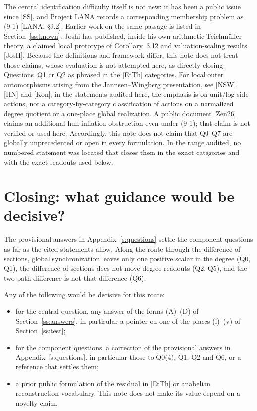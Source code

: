 \documentclass[11pt]{article}
\theoremstyle{definition}
\begin{document}
The central identification difficulty itself is not new: it has
been a public issue since [SS], and Project LANA records a
corresponding membership problem as (9-1) [LANA, \S9.2].  Earlier
work on the same passage is listed in Section~\ref{ss:known}.  Joshi has published,
inside his own arithmetic Teichm\"uller theory, a claimed local
prototype of Corollary~3.12 and valuation-scaling results
[JosII].  Because the definitions and framework differ, this note
does not treat those claims, whose evaluation is not attempted
here, as directly closing Questions~Q1 or Q2 as phrased in the
[EtTh] categories.  For local outer automorphisms arising from
the Jannsen--Wingberg presentation, see [NSW], [HN] and [Kon];
in the statements audited here, the emphasis is on unit/log-side
actions, not a category-by-category classification of actions on
a normalized degree quotient or a one-place global realization.
A public document [Zen26] claims an additional hull-inflation
obstruction even under (9-1); that claim is not verified or used
here.  Accordingly, this note does not claim that Q0--Q7 are
globally unprecedented or open in every formulation.  In the
range audited, no numbered statement was located that closes
them in the exact categories and with the exact readouts used
below.

\section{Closing: what guidance would be decisive?}

The provisional answers in Appendix~\ref{s:questions} settle the
component questions as far as the cited statements allow.  Along the
route through the difference of sections, global synchronization
leaves only one positive scalar in the degree (Q0, Q1), the
difference of sections does not move degree readouts (Q2, Q5), and
the two-path difference is not that difference (Q6).

Any of the following would be decisive for this route:
\begin{itemize}[leftmargin=*]
\item for the central question, any answer of the forms (A)--(D) of Section~\ref{ss:answers}, in particular a pointer on one of the places (i)--(v) of Section~\ref{ss:test};
\item for the component questions, a correction of the provisional answers in Appendix~\ref{s:questions}, in particular those to Q0(4), Q1, Q2 and Q6, or a reference that settles them;
\item a prior public formulation of the residual in [EtTh] or anabelian reconstruction vocabulary.  This note does not make its value depend on a novelty claim.
\end{itemize}
\end{document}
